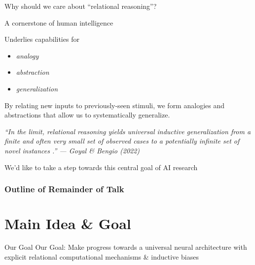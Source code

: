 \documentclass[xcolor={dvipsnames}]{beamer}
\begin{document}
\begin{frame}{Why should we care about ``relational reasoning''?}

    A cornerstone of human intelligence

    Underlies capabilities for
    \begin{itemize}
        \item \emph{\alert{analogy}}
        \item \emph{\alert{abstraction}}
        \item \emph{\alert{generalization}}
    \end{itemize}

    By relating new inputs to previously-seen stimuli, we form \alert{analogies} and \alert{abstractions} that allow us to \alert{systematically generalize}.
\end{frame}

\begin{frame}[standout]
    \begin{center}
        \emph{``In the limit, relational reasoning yields universal inductive generalization from a finite and often very small set of observed cases to a potentially infinite set of novel instances
        .'' --- Goyal \& Bengio (2022)}
    \end{center}
\end{frame}

\begin{frame}[standout]
    We'd like to take a step towards this central goal of AI research
\end{frame}

\begin{frame}
  \frametitle{Outline of Remainder of Talk}
  \begingroup
  \tableofcontents[sections={1}]
  \endgroup
  \tableofcontents[sections={2-}]
\end{frame}

\section{Main Idea \& Goal}

\begin{frame}{Our Goal}
   \alert{Our Goal:} Make progress towards a universal neural architecture with explicit relational computational mechanisms \& inductive biases
\end{frame}
\end{document}
